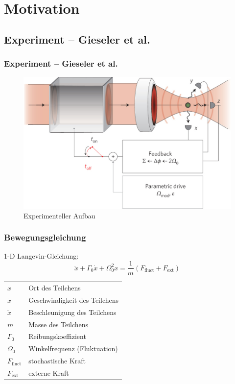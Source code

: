 \documentclass[handout]{beamer}
\begin{document}
\section{Motivation}
\subsection{Experiment -- Gieseler et al.}
\begin{frame}
\frametitle{Experiment -- Gieseler et al.}
\begin{center}
\begin{figure}
\includegraphics[scale=0.3]{../images/experimental_setup.jpg}
\caption{Experimenteller Aufbau \cite{Gieseler2014}}
\end{figure}
\end{center}
\end{frame}

\begin{frame}
\frametitle{Bewegungsgleichung}
1-D Langevin-Gleichung:
\begin{equation}
    \label{eq:langevin}
    \ddot{x} + \Gamma_0 \dot{x} + \Omega^2_0x = \frac 1 m \left(F_\text{fluct} + F_\text{ext}\right)
\end{equation}
\begin{tabular}{l l}
$x$ & Ort des Teilchens\\
$\dot{x}$ & Geschwindigkeit des Teilchens\\
$\ddot{x}$ & Beschleunigung des Teilchens\\
$m$ & Masse des Teilchens\\
$\Gamma_0$ & Reibungskoeffizient\\
$\Omega_0$ & Winkelfrequenz (Fluktuation)\\
$F_\text{fluct}$ & stochastische Kraft\\
$F_\text{ext}$ & externe Kraft
\end{tabular}
\end{frame}
\end{document}
